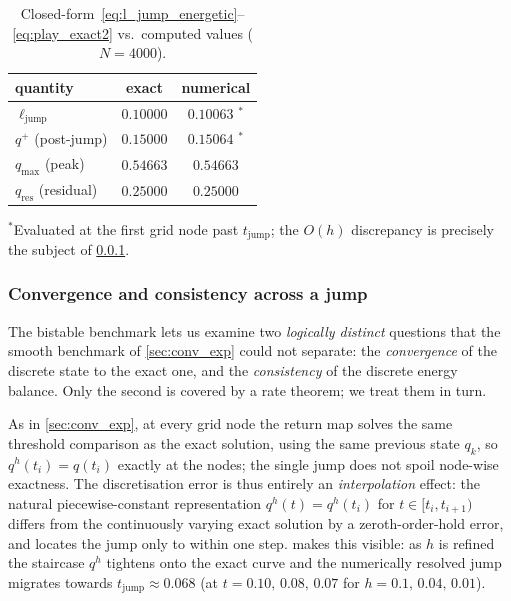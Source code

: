 \begin{table}[t]
  \centering
  \caption{Closed-form~\eqref{eq:l_jump_energetic}--\eqref{eq:play_exact2}
  vs.\ computed values ($N=4000$).}
  \label{tab:val2}
  \begin{tabular}{lcc}
    \toprule
    quantity & exact & numerical \\
    \midrule
    $\ell_{\mathrm{jump}}$ & $0.10000$ & $0.10063$ $^{\ast}$ \\
    $q^+$ (post-jump)      & $0.15000$ & $0.15064$ $^{\ast}$ \\
    $q_{\max}$ (peak)      & $0.54663$ & $0.54663$ \\
    $q_{\mathrm{res}}$ (residual) & $0.25000$ & $0.25000$ \\
    \bottomrule
  \end{tabular}
  \vspace{2pt}
  \begin{minipage}{0.85\textwidth}
    \small $^\ast$Evaluated at the first grid node past
    $t_{\mathrm{jump}}$; the $O(h)$ discrepancy is precisely the
    subject of \cref{sec:conv2}.
  \end{minipage}
\end{table}

\subsubsection{Convergence and consistency across a jump}\label{sec:conv2}

The bistable benchmark lets us examine two \emph{logically distinct}
questions that the smooth benchmark of \cref{sec:conv_exp} could not
separate: the \emph{convergence} of the discrete state to the exact one,
and the \emph{consistency} of the discrete energy balance. Only the
second is covered by a rate theorem; we treat them in turn.

As in \cref{sec:conv_exp}, at every grid node the return map solves the
same threshold comparison as the exact solution, using the same previous
state $q_k$, so $q^h(t_i)=q(t_i)$ exactly at the nodes; the single jump
does not spoil node-wise exactness. The discretisation error is thus
entirely an \emph{interpolation} effect: the natural piecewise-constant
representation $q^h(t)=q^h(t_i)$ for $t\in[t_i,t_{i+1})$ differs from the
continuously varying exact solution by a zeroth-order-hold error, and
locates the jump only to within one step.  makes this
visible: as $h$ is refined the staircase $q^h$ tightens onto the exact
curve and the numerically resolved jump migrates towards
$t_{\mathrm{jump}}\approx0.068$ (at $t=0.10,\,0.08,\,0.07$ for
$h=0.1,\,0.04,\,0.01$).

